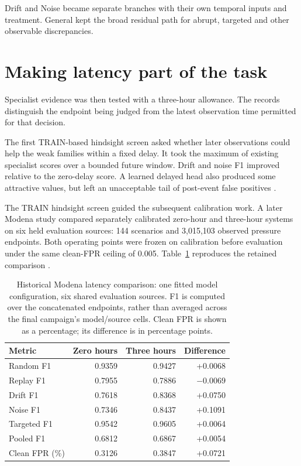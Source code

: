 Drift and Noise became separate branches with their own temporal inputs and treatment. General kept the broad residual path for abrupt, targeted and other observable discrepancies.

\section{Making latency part of the task}
Specialist evidence was then tested with a three-hour allowance. The records distinguish the endpoint being judged from the latest observation time permitted for that decision.

The first TRAIN-based hindsight screen asked whether later observations could help the weak families within a fixed delay. It took the maximum of existing specialist scores over a bounded future window. Drift and noise F1 improved relative to the zero-delay score. A learned delayed head also produced some attractive values, but left an unacceptable tail of post-event false positives \cite{projectdelay}.

The TRAIN hindsight screen guided the subsequent calibration work. A later Modena study compared separately calibrated zero-hour and three-hour systems on six held evaluation sources: 144 scenarios and 3,015,103 observed pressure endpoints. Both operating points were frozen on calibration before evaluation under the same clean-FPR ceiling of 0.005. Table~\ref{tab:historicaldelay} reproduces the retained comparison \cite{projectdelay}.

\begin{table}[!htbp]
\centering\small
\caption[Historical Modena comparison of zero and three hours]{Historical Modena latency comparison: one fitted model configuration, six shared evaluation sources. F1 is computed over the concatenated endpoints, rather than averaged across the final campaign's model/source cells. Clean FPR is shown as a percentage; its difference is in percentage points.}
\label{tab:historicaldelay}
\begin{tabular}{@{}lrrr@{}}
\toprule
Metric & Zero hours & Three hours & Difference\\
\midrule
Random F1 & 0.9359 & 0.9427 & +0.0068\\
Replay F1 & 0.7955 & 0.7886 & $-0.0069$\\
Drift F1 & 0.7618 & 0.8368 & +0.0750\\
Noise F1 & 0.7346 & 0.8437 & +0.1091\\
Targeted F1 & 0.9542 & 0.9605 & +0.0064\\
Pooled F1 & 0.6812 & 0.6867 & +0.0054\\
Clean FPR (\%) & 0.3126 & 0.3847 & +0.0721\\
\bottomrule
\end{tabular}
\end{table}

